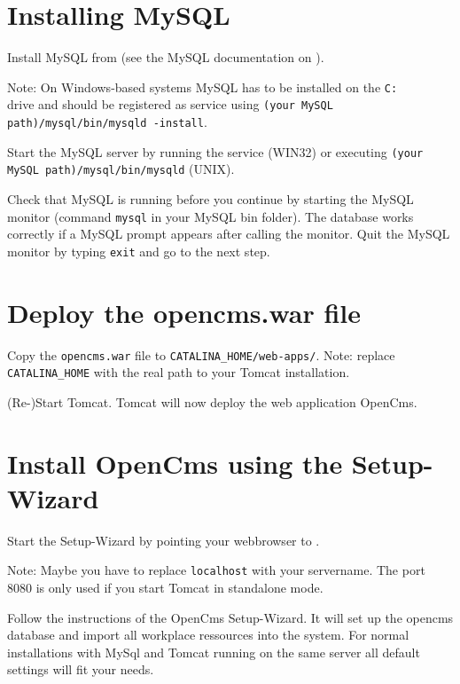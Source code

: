 \section{Installing MySQL}
Install MySQL from
(see the MySQL documentation on
).

Note: On Windows-based systems MySQL has to be installed on the
\texttt{C:\\} drive and should be registered as service using
\texttt{(your MySQL path)/mysql/bin/mysqld -install}.

Start the MySQL server by running the service (WIN32) or executing
\texttt{(your MySQL path)/mysql/bin/mysqld} (UNIX).

Check that MySQL is running before you continue by starting the
MySQL monitor (command \texttt{mysql} in your MySQL bin folder).
The database works correctly if a MySQL prompt appears after
calling the monitor. Quit the MySQL monitor by typing
\texttt{exit} and go to the next step.

\section{Deploy the opencms.war file}
Copy the \texttt{opencms.war} file to
\texttt{CATALINA\_HOME/web-apps/}. Note: replace
\texttt{CATALINA\_HOME} with the real path to your Tomcat
installation.

(Re-)Start Tomcat. Tomcat will now deploy the web application
OpenCms.

\section{Install OpenCms using the Setup-Wizard}
Start the Setup-Wizard by pointing your webbrowser to
.

Note: Maybe you have to replace \texttt{localhost} with your
servername. The port 8080 is only used if you start Tomcat in
standalone mode.

Follow the instructions of the OpenCms Setup-Wizard. It will set
up the opencms database and import all workplace ressources into
the system. For normal installations with MySql and Tomcat running
on the same server all default settings will fit your needs.


